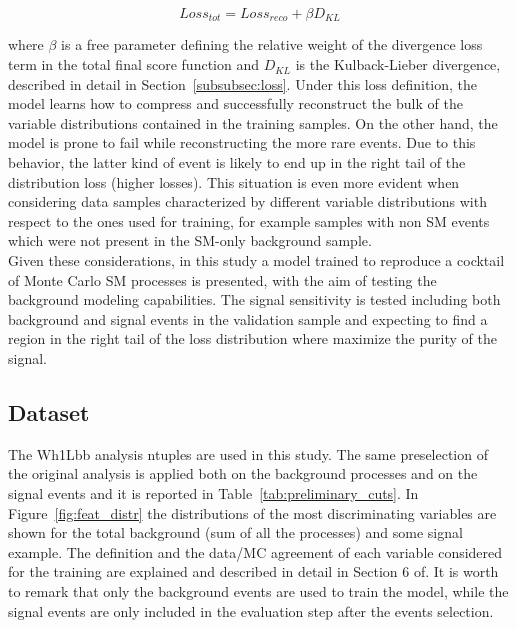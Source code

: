 \begin{equation}\label{eq:1}
    Loss_{tot}=  Loss_{reco} + \beta D_{KL}
\end{equation}

where $\beta$ is a free parameter defining the relative weight of the divergence loss term in the total final score function and $D_{KL}$ is the Kulback-Lieber divergence, described in detail in Section~\ref{subsubsec:loss}. Under this loss definition, the model learns how to compress and successfully reconstruct the bulk of the variable distributions contained in the training samples. On the other hand, the model is prone to fail while reconstructing the more rare events. Due to this behavior, the latter kind of event is likely to end up in the right tail of the distribution loss (higher losses). This situation is even more evident when considering data samples characterized by different variable distributions with respect to the ones used for training, for example samples with non SM events which were not present in the SM-only background sample. \\Given these considerations, in this study a model trained to reproduce a cocktail of Monte Carlo SM processes is presented, with the aim of testing the background modeling capabilities. The signal sensitivity is tested including both background and signal events in the validation sample and expecting to find a region in the right tail of the loss distribution where maximize the purity of the signal.

\subsection{Dataset}
\label{subsec:dataset}

The Wh1Lbb analysis ntuples are used in this study. The same preselection of the original analysis is applied both on the background processes and on the signal events and it is reported in Table~\ref{tab:preliminary_cuts}. In Figure~\ref{fig:feat_distr} the distributions of the most discriminating variables are shown for the total background (sum of all the processes) and some signal example. The definition and the data/MC agreement of each variable considered for the training are explained and described in detail in Section 6 of. It is worth to remark that only the background events are used to train the model, while the signal events are only included in the evaluation step after the events selection.

